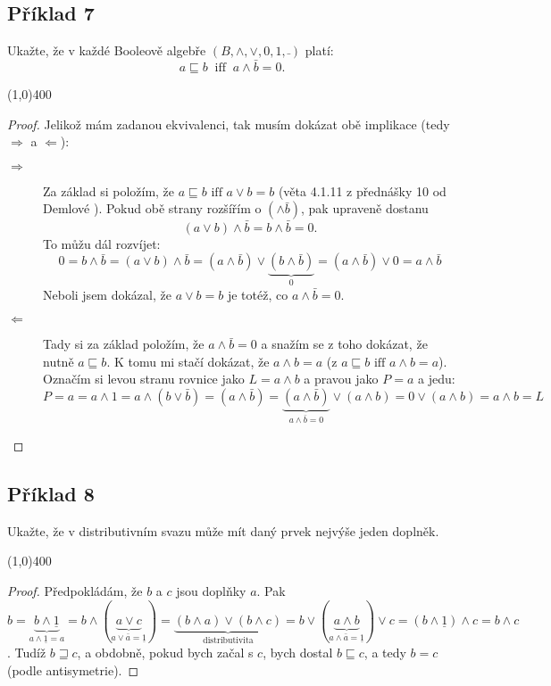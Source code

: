 \documentclass{article}
\begin{document}
\subsection{Příklad 7}
Ukažte, že v každé Booleově algebře $(B,\wedge,\vee,0,1,\bar{\ })$ platí:
\[ a \sqsubseteq b \ \mbox{ iff } \ a \wedge \bar{b} = 0. \]

\line(1,0){400}

\begin{proof}
Jelikož mám zadanou ekvivalenci, tak musím dokázat obě implikace (tedy $\Rightarrow$ a $\Leftarrow$):

\begin{description}
	\item[$\Rightarrow$] Za základ si položím, že $a \sqsubseteq b \mbox{ iff } a \vee b = b$ (věta 4.1.11 z přednášky 10 od Demlové \cite{prednasky}). Pokud obě strany rozšířím o $(\wedge \bar{b})$, pak upraveně dostanu
	\[ (a \vee b) \wedge \bar{b} = b \wedge \bar{b} = 0.\]
	To můžu dál rozvíjet:
	\[ 0 = b \wedge \bar{b} = (a \vee b) \wedge \bar{b} = (a \wedge \bar{b}) \vee \underbrace{(b \wedge \bar{b})}_{0} = (a \wedge \bar{b}) \vee 0 = a \wedge \bar{b} \]
	Neboli jsem dokázal, že  $a \vee b = b$ je totéž, co $a \wedge \bar{b} = 0$.
	\item[$\Leftarrow$] Tady si za základ položím, že $a \wedge \bar{b} = 0$ a snažím se z toho dokázat, že nutně $a \sqsubseteq b$. K tomu mi stačí dokázat, že $a \wedge b = a$ (z $a \sqsubseteq b \mbox{ iff } a \wedge b = a$). Označím si levou stranu rovnice jako $L = a \wedge b$ a pravou jako $P = a$ a jedu:
	\[ P = a = a \wedge 1 = a \wedge (b \vee \bar{b}) = (a \wedge \bar{b}) = \underbrace{(a \wedge \bar{b})}_{a \wedge \bar{b} = 0} \vee (a \wedge b) = 0 \vee (a \wedge b) = a \wedge b = L \]
\end{description}
\end{proof}

\subsection{Příklad 8}
Ukažte, že v distributivním svazu může mít daný prvek nejvýše jeden doplněk.

\line(1,0){400}

\begin{proof}
Předpokládám, že $b$ a $c$ jsou doplňky $a$. Pak $b = \underbrace{b\wedge\underline{1}}_{a \wedge \underline{1} = a} = b\wedge(\underbrace{a \vee c}_{a \vee \bar{a} = \underline{1}}) = \underbrace{(b\wedge a)\vee(b\wedge c)}_{\mbox{distributivita}} = b \vee (\underbrace{a \wedge b}_{a \wedge \bar{a} = \underline{1}}) \vee c = (b \wedge \underline{1}) \wedge c = b \wedge c$. Tudíž $b \sqsupseteq c$, a obdobně, pokud bych začal s $c$, bych dostal $b \sqsubseteq c$, a tedy $b = c$ (podle antisymetrie).  
\end{proof}
\end{document}
